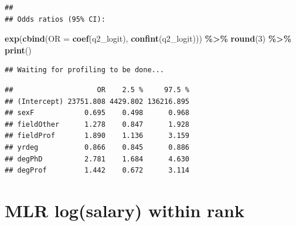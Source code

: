 \documentclass[
]{article}
\newenvironment{Shaded}{\begin{snugshade}}{\end{snugshade}}
\newcommand{\AttributeTok}[1]{\textcolor[rgb]{0.13,0.29,0.53}{#1}}
\newcommand{\DecValTok}[1]{\textcolor[rgb]{0.00,0.00,0.81}{#1}}
\newcommand{\FunctionTok}[1]{\textcolor[rgb]{0.13,0.29,0.53}{\textbf{#1}}}
\newcommand{\NormalTok}[1]{#1}
\newcommand{\SpecialCharTok}[1]{\textcolor[rgb]{0.81,0.36,0.00}{\textbf{#1}}}
\begin{document}
\begin{verbatim}
## 
## Odds ratios (95% CI):
\end{verbatim}

\begin{Shaded}
\begin{Highlighting}[]
\FunctionTok{exp}\NormalTok{(}\FunctionTok{cbind}\NormalTok{(}\AttributeTok{OR =} \FunctionTok{coef}\NormalTok{(q2\_logit), }\FunctionTok{confint}\NormalTok{(q2\_logit))) }\SpecialCharTok{\%\textgreater{}\%}
  \FunctionTok{round}\NormalTok{(}\DecValTok{3}\NormalTok{) }\SpecialCharTok{\%\textgreater{}\%}
  \FunctionTok{print}\NormalTok{()}
\end{Highlighting}
\end{Shaded}

\begin{verbatim}
## Waiting for profiling to be done...
\end{verbatim}

\begin{verbatim}
##                    OR    2.5 %     97.5 %
## (Intercept) 23751.808 4429.802 136216.895
## sexF            0.695    0.498      0.968
## fieldOther      1.278    0.847      1.928
## fieldProf       1.890    1.136      3.159
## yrdeg           0.866    0.845      0.886
## degPhD          2.781    1.684      4.630
## degProf         1.442    0.672      3.114
\end{verbatim}

\section{MLR log(salary) within rank}\label{mlr-logsalary-within-rank}
\end{document}
